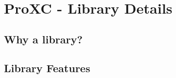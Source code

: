 
\chapter{ProXC - Library Details}
\label{ch:library_details}


\section{Why a library?}

\section{Library Features}


